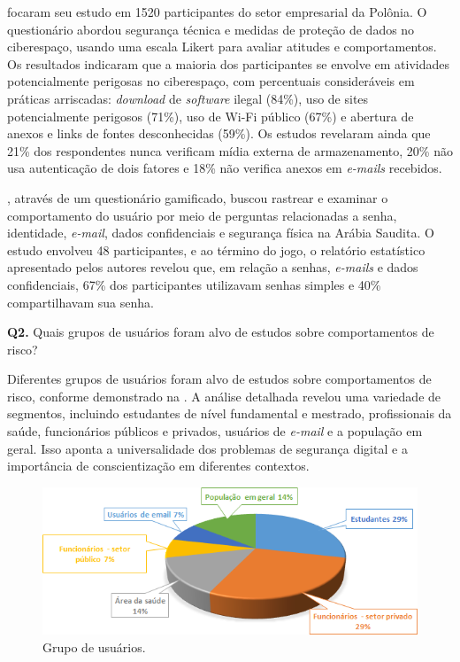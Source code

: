 \documentclass[portuguese]{textolivre}
\begin{document}
\textcite{szczepaniuk_analysis_2022} focaram seu estudo em 1520 participantes do setor empresarial da Polônia. O questionário abordou segurança técnica e medidas de proteção de dados no ciberespaço, usando uma escala Likert para avaliar atitudes e comportamentos. Os resultados indicaram que a maioria dos participantes se envolve em atividades potencialmente perigosas no ciberespaço, com percentuais consideráveis em práticas arriscadas: \textit{download} de \textit{software} ilegal (84\%), uso de sites potencialmente perigosos (71\%), uso de Wi-Fi público (67\%) e abertura de anexos e links de fontes desconhecidas (59\%). Os estudos revelaram ainda que 21\% dos respondentes nunca verificam mídia externa de armazenamento, 20\% não usa autenticação de dois fatores e 18\% não verifica anexos em \textit{e-mails} recebidos.

\textcite{alissa_appling_2022}, através de um questionário gamificado, buscou rastrear e examinar o comportamento do usuário por meio de perguntas relacionadas a senha, identidade, \textit{e-mail}, dados confidenciais e segurança física na Arábia Saudita. O estudo envolveu 48 participantes, e ao término do jogo, o relatório estatístico apresentado pelos autores revelou que, em relação a senhas, \textit{e-mails} e dados confidenciais, 67\% dos participantes utilizavam senhas simples e 40\% compartilhavam sua senha.

\textbf{Q2.} Quais grupos de usuários foram alvo de estudos sobre comportamentos de risco?

Diferentes grupos de usuários foram alvo de estudos sobre comportamentos de risco, conforme demonstrado na . A análise detalhada revelou uma variedade de segmentos, incluindo estudantes de nível fundamental e mestrado, profissionais da saúde, funcionários públicos e privados, usuários de \textit{e-mail} e a população em geral. Isso aponta a universalidade dos problemas de segurança digital e a importância de conscientização em diferentes contextos.

\begin{figure}[htbp]
\centering
\begin{minipage}{0.65\linewidth}
  \includegraphics[width=\linewidth]{Fig4.png}
  \caption{Grupo de usuários.}
  \label{fig4}
\end{minipage}
\end{figure}
\end{document}
